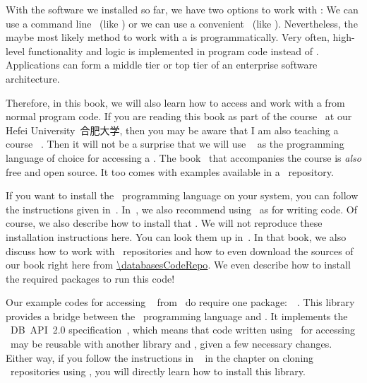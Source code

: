 %
%
With the software we installed so far, we have two options to work with :
We can use a command line ~(like \psql) or we can use a convenient ~(like \libreofficeBase).
Nevertheless, the maybe most likely method to work with a  is programmatically.
Very often, high-level functionality and logic is implemented in program code instead of \sql.
Applications can form a middle tier or top tier of an enterprise software architecture.

Therefore, in this book, we will also learn how to access and work with a  from normal program code.
If you are reading this book as part of the  course~\cite{databases} at our Hefei University~合肥大学, then you may be aware that I am also teaching a course ~\cite{programmingWithPython}.
Then it will not be a surprise that we will use \python~\cite{H2023ABGTP3P,LH2015DSAAWP,programmingWithPython} as the programming language of choice for accessing a .
The book~\cite{programmingWithPython} that accompanies the  course is \emph{also} free and open source.
It too comes with examples available in a \github\ repository.

If you want to install the \python\ programming language on your system, you can follow the instructions given in~\cite{programmingWithPython}.
In~\cite{programmingWithPython}, we also recommend using \pycharm\ as  for writing code.
Of course, we also describe how to install that .
We will not reproduce these installation instructions here.
You can look them up in~\cite{programmingWithPython}.
In that book, we also discuss how to work with \git\ repositories and how to even download the sources of our book right here from \url{\databasesCodeRepo}.
We even describe how to install the required packages to run this code!%
%
\begin{sloppypar}%
Our example codes for accessing \postgresql\  from \python\ do require one package:~\psycopg~\cite{VDGE2010P}.
This library provides a bridge between the \python\ programming language and \postgresql.
It implements the \python~\acrshort{DB}~\acrshort{API}~2.0 specification~\cite{PEP249}, which means that code written using \psycopg\ for accessing \postgresql\ may be reusable with another library and , given a few necessary changes.
Either way, if you follow the instructions in ~\cite{programmingWithPython} in the chapter on cloning \git~repositories using \pycharm, you will directly learn how to install this library.%
\end{sloppypar}%
%
%
%
\endhsection%
